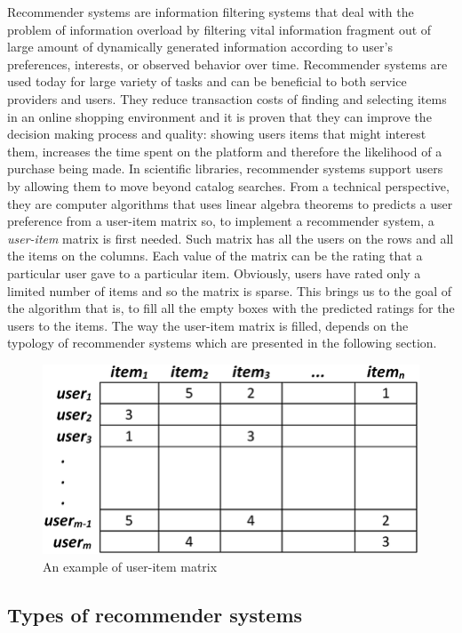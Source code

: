 \documentclass[b5paper,10pt,twoside,cucitura]{toptesi}
\begin{document}
Recommender systems are information filtering systems that deal with the problem of information overload by filtering vital information fragment out of large amount of dynamically generated information according to user's preferences, interests, or observed behavior over time. Recommender systems are used today for large variety of tasks and can be beneficial to both service providers and users. They reduce transaction costs of finding and selecting items in an online shopping environment and it is proven that they can improve the decision making process and quality: showing users items that might interest them, increases the time spent on the platform and therefore the likelihood of a purchase being made. In scientific libraries, recommender systems support users by allowing them to move beyond catalog searches. From a technical perspective, they are computer algorithms that uses linear algebra theorems to predicts a user preference from a user-item matrix so, to implement a recommender system, a \textit{user-item} matrix is first needed. Such matrix has all the users on the rows and all the items on the columns. Each value of the matrix can be the rating that a particular user gave to a particular item. Obviously, users have rated only a limited number of items and so the matrix is sparse. This brings us to the goal of the algorithm that is, to fill all the empty boxes with the predicted ratings for the users to the items. The way the user-item matrix is filled, depends on the typology of recommender systems which are presented in the following section.

\begin{figure}[h]
\centering 
\includegraphics[scale=0.3]{user-item_matrix}
\caption{An example of user-item matrix}
\end{figure}
 
 
\subsection{Types of recommender systems}
\end{document}
